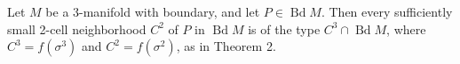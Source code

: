 Let $M$ be a 3-manifold with boundary, and let $P \in \operatorname{Bd} M$. Then every sufficiently small 2-cell neighborhood $C^2$ of $P$ in $\operatorname{Bd} M$ is of the type $C^3 \cap \operatorname{Bd} M$, where $C^3 = f(\sigma^3)$ and $C^2 = f(\sigma^2)$, as in Theorem 2.
